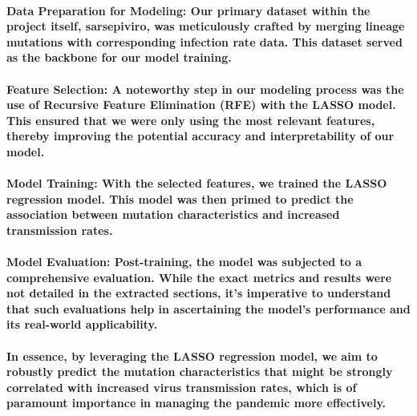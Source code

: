 \documentclass{article}
\begin{document}
\paragraph{\textbf{}}
\paragraph{\textbf{Data Preparation for Modeling}: Our primary dataset within the project itself, sarsepiviro, was meticulously crafted by merging lineage mutations with corresponding infection rate data. This dataset served as the backbone for our model training.}
\paragraph{\textbf{}}
\paragraph{\textbf{Feature Selection}: A noteworthy step in our modeling process was the use of Recursive Feature Elimination (RFE) with the LASSO model. This ensured that we were only using the most relevant features, thereby improving the potential accuracy and interpretability of our model.}
\paragraph{\textbf{}}
\paragraph{\textbf{Model Training}: With the selected features, we trained the LASSO regression model. This model was then primed to predict the association between mutation characteristics and increased transmission rates.}
\paragraph{\textbf{}}
\paragraph{\textbf{Model Evaluation}: Post-training, the model was subjected to a comprehensive evaluation. While the exact metrics and results were not detailed in the extracted sections, it's imperative to understand that such evaluations help in ascertaining the model's performance and its real-world applicability.}
\paragraph{In essence, by leveraging the LASSO regression model, we aim to robustly predict the mutation characteristics that might be strongly correlated with increased virus transmission rates, which is of paramount importance in managing the pandemic more effectively.}
\end{document}
